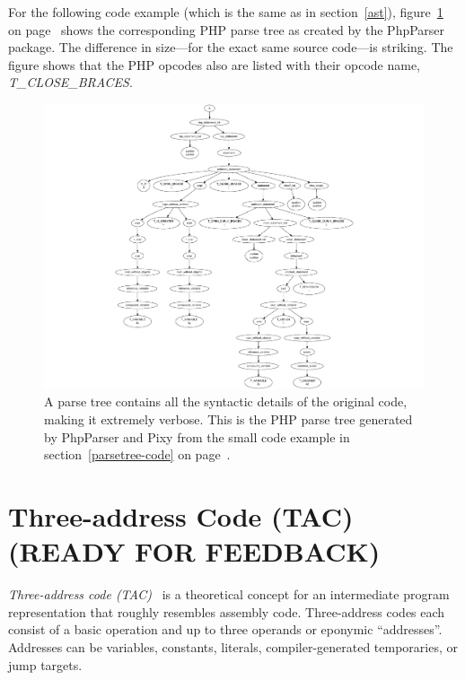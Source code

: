 For the following code example (which is the same as in section~\ref{ast}), figure~\ref{fig:parse-tree} on page~\pageref{fig:parse-tree} shows the corresponding PHP parse tree as created by the PhpParser package. The difference in size---for the exact same source code---is striking. The figure shows that the PHP opcodes also are listed with their opcode name, \eg \emph{T\_CLOSE\_BRACES}.

\label{parsetree-code}

\begin{figure}[htb]
  \begin{center}
    \includegraphics[scale=0.84, trim=54mm 0mm 0mm 0mm]{images/parse-tree}
    \caption{A parse tree contains all the syntactic details of the original code, making it extremely verbose. This is the PHP parse tree generated by PhpParser and Pixy from the small code example in section~\ref{parsetree-code} on page~\pageref{parsetree-code}.}
    \label{fig:parse-tree}
  \end{center}
\end{figure}



\section{Three-address Code (TAC) (READY FOR FEEDBACK)}
\label{tac}

\emph{Three-address code (TAC)}~\cite{compiler-construction, compilers} is a theoretical concept for an intermediate program representation that roughly resembles assembly code. Three-address codes each consist of a basic operation and up to three operands or eponymic ``addresses''. Addresses can be variables, constants, literals, compiler-generated temporaries, or jump targets.

